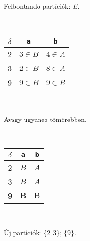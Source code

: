 \documentclass[a4paper,11pt]{article}
\begin{document}
\begin{minipage}{0.45\linewidth}
	\begin{center}
		Felbontandó partíciók: $B$.
		
		~
		
		\begin{tabular}{c|cc}
			$\delta$ & \texttt{a} & \texttt{b} \\
			\hline
			2 & $3 \in B$ & $4 \in A$ \\
			3 & $2 \in B$ & $8 \in A$ \\
			9 & $9 \in B$ & $9 \in B$ 
		\end{tabular}
	
		~
	
		Avagy ugyanez tömörebben.
		
		~
		
		\begin{tabular}{c|cc}
			$\delta$ & \texttt{a} & \texttt{b} \\
			\hline
			2 & $B$ & $A$ \\
			3 & $B$ & $A$ \\
			\textbf{9} & $\textbf{B}$ & $\textbf{B}$ 
		\end{tabular}
	
		~
		
		Új partíciók: $\{2,3\}$; $\{9\}$.
	\end{center}
\end{minipage}

\end{document}
